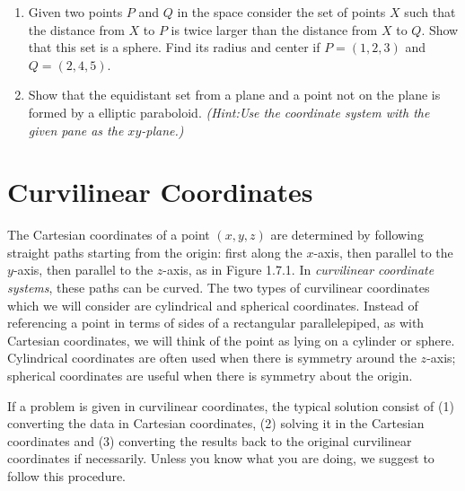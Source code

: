 \begin{enumerate}[\bfseries 1.]
 \item Given two points $P$ and $Q$ in the space consider the set of points $X$ such that the distance from $X$ to $P$ is twice larger than the distance from $X$ to $Q$.
 Show that this set is a sphere. 
 Find its radius and center if $P=(1,2,3)$ and $Q=(2,4,5)$.
 
\item Show that the equidistant set from a plane and a point not on the plane is formed by a elliptic paraboloid.
\emph{(Hint:Use the coordinate system with the given pane as the $xy$-plane.)}
 
\end{enumerate}

\newpage
\section{Curvilinear Coordinates}
\piccaption[]{}
The Cartesian coordinates of a point $(x,y,z)$ are determined by following straight paths starting from the origin: 
first along the $x$-axis, then parallel to the $y$-axis, then parallel to the $z$-axis, as in
Figure 1.7.1. In \emph{curvilinear coordinate systems}, these paths can be curved.
The two types of curvilinear coordinates which we will consider are cylindrical and
spherical coordinates.
Instead of referencing a point in terms of sides of a rectangular parallelepiped, as with Cartesian coordinates, we will
think of the point as lying on a cylinder or sphere.
Cylindrical coordinates are often used when there is symmetry around the $z$-axis; 
spherical coordinates are useful when there is symmetry about the origin.

If a problem is given in curvilinear coordinates, 
the typical solution consist of (1) converting the data in Cartesian coordinates, (2) solving it in the Cartesian coordinates and (3) converting the results back to the original curvilinear coordinates if necessarily.
Unless you know what you are doing, we suggest to follow this procedure.

